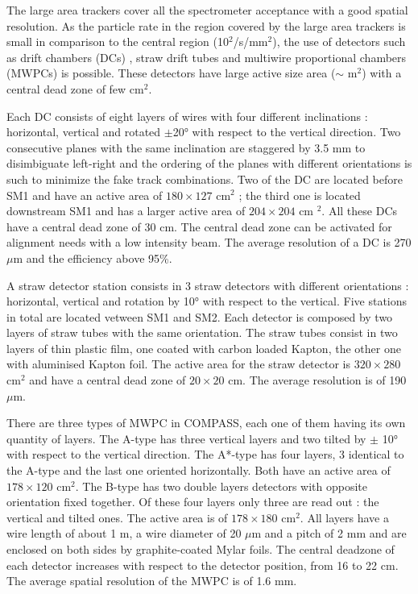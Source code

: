The large area trackers cover all the spectrometer acceptance with a good spatial resolution. As the particle rate in the region
covered by the large area trackers is small in comparison to the central region (10$^2$/s/mm$^2$), the use of detectors such as
drift chambers (DCs) \cite{}, straw drift tubes \cite{} and multiwire proportional chambers (MWPCs) is possible. These detectors
have large active size area ($\sim$ m$^2$) with a central dead zone of few cm$^2$.

Each DC consists of eight layers of wires with four different inclinations : horizontal, vertical and rotated $\pm$20° with respect
to the vertical direction. Two consecutive planes with the same inclination are staggered by 3.5 mm to disimbiguate left-right and
the ordering of the planes with different orientations is such to minimize the fake track combinations. Two of the DC are located before
SM1 and have an active area of $180 \times 127$ cm$^2$ ; the third one is located downstream SM1 and has a larger active area of $204 \times 204$ cm $^2$.
All these DCs have a central dead zone of 30 cm. The central dead zone can be activated for alignment needs with a low intensity beam.
The average resolution of a DC is 270 $\mu$m and the efficiency above 95\%.

A straw detector station consists in 3 straw detectors with different orientations : horizontal, vertical and rotation by 10° with respect
to the vertical. Five stations in total are located vetween SM1 and SM2. Each detector is composed by two layers of straw tubes with the
same orientation. The straw tubes consist in two layers of thin plastic film, one coated with carbon loaded Kapton, the other one with
aluminised Kapton foil. The active area for the straw detector is $320 \times 280$ cm$^2$ and have a central dead zone of $20 \times 20$ cm.
The average resolution is of 190 $\mu$m.

There are three types of MWPC in COMPASS, each one of them having its own quantity of layers. The A-type has three vertical layers and two tilted
by $\pm$ 10° with respect to the vertical direction. The A*-type has four layers, 3 identical to the A-type and the last one oriented horizontally.
Both have an active area of $178 \times 120$ cm$^2$. The B-type has two double layers detectors with opposite orientation fixed together. Of these
four layers only three are read out : the vertical and tilted ones. The active area is of $178 \times 180$ cm$^2$. All layers have a wire length of
about 1 m, a wire diameter of 20 $\mu$m and a pitch of 2 mm and are enclosed on both sides by graphite-coated Mylar foils. The central deadzone of each
detector increases with respect to the detector position, from 16 to 22 cm. The average spatial resolution of the MWPC is of 1.6 mm.

